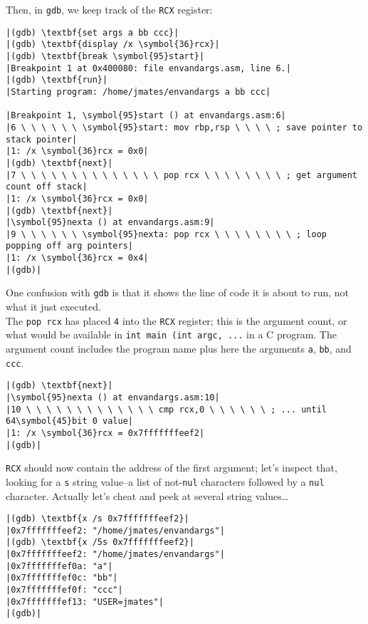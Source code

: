 \documentclass[10pt,a4paper]{article}
\begin{document}
Then, in \texttt{gdb}, we keep track of the \texttt{RCX} register:

\begin{lstlisting}
|(gdb) \textbf{set args a bb ccc}|
|(gdb) \textbf{display /x \symbol{36}rcx}|
|(gdb) \textbf{break \symbol{95}start}|
|Breakpoint 1 at 0x400080: file envandargs.asm, line 6.|
|(gdb) \textbf{run}|
|Starting program: /home/jmates/envandargs a bb ccc|

|Breakpoint 1, \symbol{95}start () at envandargs.asm:6|
|6 \ \ \ \ \ \ \symbol{95}start: mov rbp,rsp \ \ \ \ ; save pointer to stack pointer|
|1: /x \symbol{36}rcx = 0x0|
|(gdb) \textbf{next}|
|7 \ \ \ \ \ \ \ \ \ \ \ \ \ \ pop rcx \ \ \ \ \ \ \ \ ; get argument count off stack|
|1: /x \symbol{36}rcx = 0x0|
|(gdb) \textbf{next}|
|\symbol{95}nexta () at envandargs.asm:9|
|9 \ \ \ \ \ \ \symbol{95}nexta: pop rcx \ \ \ \ \ \ \ \ ; loop popping off arg pointers|
|1: /x \symbol{36}rcx = 0x4|
|(gdb)|
\end{lstlisting}

One confusion with \texttt{gdb} is that it shows the line of code it is
about to run, not what it just executed. \\

The \texttt{pop rcx} has placed \texttt{4} into the \texttt{RCX}
register; this is the argument count, or what would be available in
\texttt{int main (int argc, ...} in a C program. The argument count
includes the program name plus here the arguments \texttt{a},
\texttt{bb}, and \texttt{ccc}.

\begin{lstlisting}
|(gdb) \textbf{next}|
|\symbol{95}nexta () at envandargs.asm:10|
|10 \ \ \ \ \ \ \ \ \ \ \ \ \ cmp rcx,0 \ \ \ \ \ \ ; ... until 64\symbol{45}bit 0 value|
|1: /x \symbol{36}rcx = 0x7fffffffeef2|
|(gdb)|
\end{lstlisting}

\texttt{RCX} should now contain the address of the first argument; let's
inspect that, looking for a \texttt{s} string value--a list of
not-\texttt{nul} characters followed by a \texttt{nul} character.
Actually let's cheat and peek at several string values\ldots

\begin{lstlisting}
|(gdb) \textbf{x /s 0x7fffffffeef2}|
|0x7fffffffeef2: "/home/jmates/envandargs"|
|(gdb) \textbf{x /5s 0x7fffffffeef2}|
|0x7fffffffeef2: "/home/jmates/envandargs"|
|0x7fffffffef0a: "a"|
|0x7fffffffef0c: "bb"|
|0x7fffffffef0f: "ccc"|
|0x7fffffffef13: "USER=jmates"|
|(gdb)|
\end{lstlisting}
\end{document}
